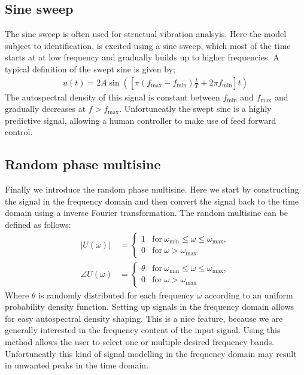 \subsection{Sine sweep}
The sine sweep is often used for structual vibration analsyis. Here the model subject to identification, is excited using a sine sweep, which most of the time starts at at low frequency and gradually builds up to higher frequencies. A typical definition of the swept sine is given by;
	\begin{align}
			u(t) = 2A\sin\left(\left[\pi(f_\textrm{max}-f_\textrm{min})\frac{t}{T} + 2\pi f_\textrm{min}\right] t\right)
	\end{align}
The autospectral density of this signal is constant between $f_\textrm{min}$ and $f_\textrm{max}$ and gradually decreases at $f>f_\textrm{max}$.
		Unfortuneatly the swept sine is a highly predictive signal, allowing a human controller to make use of feed forward control.
\subsection{Random phase multisine}
Finally we introduce the random phase multisine. Here we start by constructing the signal in the frequency domain and then convert the signal back to the time domain using a inverse Fourier transformation. The random multisine can be defined as follows:
	\begin{align}
			|U(\omega)| &= \begin{cases} 1 & \mathrm{for}  \ \omega_\textrm{min} \le \omega \le \omega_\textrm{max}, \\ 0 & \mathrm{for}\ \omega > \omega_\textrm{max} \end{cases}  \\
			\angle U(\omega) &= \begin{cases} \theta & \mathrm{for}  \ \omega_\textrm{min} \le \omega \le \omega_\textrm{max}, \\ 0 & \mathrm{for}\ \omega > \omega_\textrm{max} \end{cases}  
	\end{align}
Where $\theta$ is randomly distributed for each frequency $\omega$ according to an uniform probability density function.
Setting up signals in the frequency domain allows for easy autospectral density shaping. This is a nice feature, because we are generally interested in the frequency content of the input signal. Using this method allows the user to select one or multiple desired frequency bands. Unfortuneatly this kind of signal modelling in the frequency domain may result in unwanted peaks in the time domain.
